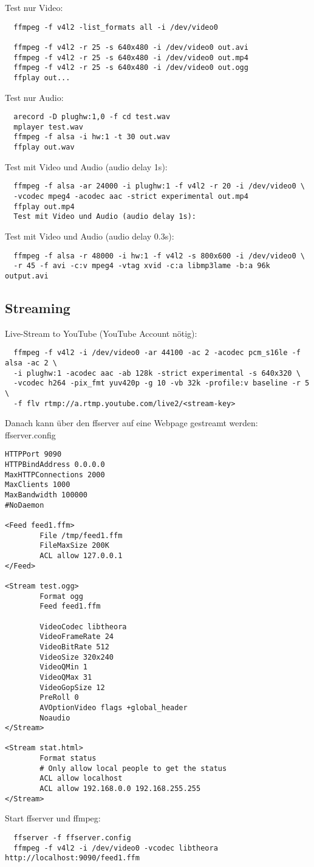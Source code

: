 Test nur Video:
\begin{verbatim}
  ffmpeg -f v4l2 -list_formats all -i /dev/video0

  ffmpeg -f v4l2 -r 25 -s 640x480 -i /dev/video0 out.avi
  ffmpeg -f v4l2 -r 25 -s 640x480 -i /dev/video0 out.mp4
  ffmpeg -f v4l2 -r 25 -s 640x480 -i /dev/video0 out.ogg
  ffplay out...
\end{verbatim}

Test nur Audio:
\begin{verbatim}
  arecord -D plughw:1,0 -f cd test.wav
  mplayer test.wav
  ffmpeg -f alsa -i hw:1 -t 30 out.wav
  ffplay out.wav
\end{verbatim}

Test mit Video und Audio (audio delay 1s):
\begin{verbatim}
  ffmpeg -f alsa -ar 24000 -i plughw:1 -f v4l2 -r 20 -i /dev/video0 \
  -vcodec mpeg4 -acodec aac -strict experimental out.mp4
  ffplay out.mp4
  Test mit Video und Audio (audio delay 1s):
\end{verbatim}
Test mit Video und Audio (audio delay 0.3s):
\begin{verbatim}
  ffmpeg -f alsa -r 48000 -i hw:1 -f v4l2 -s 800x600 -i /dev/video0 \
  -r 45 -f avi -c:v mpeg4 -vtag xvid -c:a libmp3lame -b:a 96k output.avi
\end{verbatim}

\subsection{Streaming}
Live-Stream to YouTube (YouTube Account nötig):
\begin{verbatim}
  ffmpeg -f v4l2 -i /dev/video0 -ar 44100 -ac 2 -acodec pcm_s16le -f alsa -ac 2 \
  -i plughw:1 -acodec aac -ab 128k -strict experimental -s 640x320 \
  -vcodec h264 -pix_fmt yuv420p -g 10 -vb 32k -profile:v baseline -r 5 \ 
  -f flv rtmp://a.rtmp.youtube.com/live2/<stream-key>
\end{verbatim}

Danach kann über den ffserver auf eine Webpage gestreamt werden:\\
ffserver.config
\begin{verbatim}
HTTPPort 9090
HTTPBindAddress 0.0.0.0
MaxHTTPConnections 2000
MaxClients 1000
MaxBandwidth 100000
#NoDaemon

<Feed feed1.ffm>
        File /tmp/feed1.ffm
        FileMaxSize 200K
        ACL allow 127.0.0.1
</Feed>

<Stream test.ogg>
        Format ogg
        Feed feed1.ffm

        VideoCodec libtheora
        VideoFrameRate 24
        VideoBitRate 512
        VideoSize 320x240
        VideoQMin 1
        VideoQMax 31
        VideoGopSize 12
        PreRoll 0
        AVOptionVideo flags +global_header
        Noaudio
</Stream>

<Stream stat.html>
        Format status
        # Only allow local people to get the status
        ACL allow localhost
        ACL allow 192.168.0.0 192.168.255.255
</Stream>                         
\end{verbatim}

Start ffserver und ffmpeg:
\begin{verbatim}
  ffserver -f ffserver.config
  ffmpeg -f v4l2 -i /dev/video0 -vcodec libtheora http://localhost:9090/feed1.ffm
\end{verbatim}

